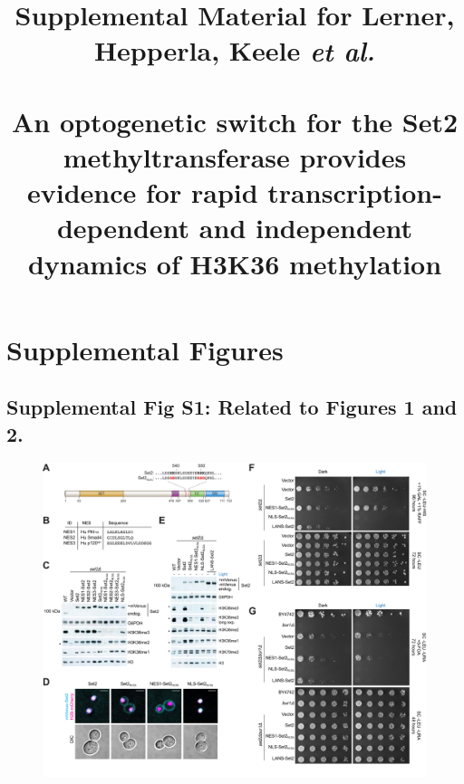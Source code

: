 \documentclass[11pt]{biorxiv}
\title{Supplemental Material for Lerner, Hepperla, Keele \emph{et al.} \\~\\ An optogenetic switch for the Set2 methyltransferase provides evidence for rapid transcription-dependent and independent dynamics of H3K36 methylation}
\author[1]{ }
\begin{document}
\maketitle
\author{}
\thispagestyle{empty}
\tableofcontents

\newpage

\setcounter{page}{1}

\section{Supplemental Figures}
\subsection{Supplemental Fig S1: Related to Figures 1 and 2.}
\begin{figure}[ht!]
\center
\includegraphics[width=\textwidth, trim={0in 0in 0in 0in}, clip]{figures/Supplemental_Fig_S1_compressed.pdf}
\end{figure}
\end{document}

